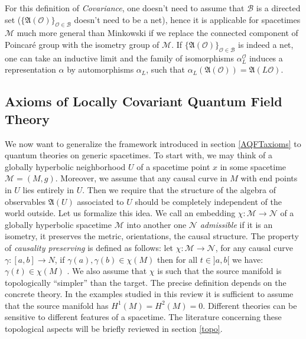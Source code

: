 \documentclass[12pt]{article}
\newcommand{\fA}{\mathfrak{A}}
\newcommand{\Ncal}{\mathcal{N}}
\newcommand{\Mcal}{\mathcal{M}}
\newcommand{\Ocal}{\mathcal{O}}
\newcommand{\al}{\alpha}
\newcommand{\1}{\mathds{1}}                         %
\begin{document}
\begin{rem}
For this definition of \textit{Covariance}, one doesn't need to assume that $\mathcal{B}$ is a directed set ($\{\fA(\Ocal)\}_{\Ocal\in\mathcal{B}}$ doesn't need to be a net), hence it is applicable for spacetimes $\Mcal$ much more general than Minkowski if we replace the connected component of Poincar\'e group with the isometry group of $\Mcal$. If $\{\fA(\Ocal)\}_{\Ocal\in\mathcal{B}}$ is indeed a net, one can take an inductive limit and the family of isomorphisms $\alpha_L^\Ocal$ induces a representation $\al$ by automorphisms $\al_L$, such that $\al_L(\fA(\Ocal))=\fA(L\Ocal)$. 
\end{rem}
\subsection{Axioms of Locally Covariant Quantum Field Theory}\label{axioms}
We now want to generalize the framework introduced in section \ref{AQFTaxioms} to quantum theories on generic spacetimes. To start with, we may think of a globally hyperbolic neighborhood  $U$ of a spacetime point $x$ in some spacetime  $\Mcal=(M,g)$. 
Moreover, we assume that any causal curve in $M$ with end points in $U$ lies entirely 
in $U$. Then we require that the structure of the algebra of observables $\fA(U)$ associated to $U$ should be completely independent of the world outside. Let us formalize this idea. We call an embedding $\chi:\Mcal\to \Ncal$ of a globally hyperbolic spacetime $\mathcal{M}$ into another one $\Ncal$ \textit{admissible} if it is an isometry, it preserves the metric, orientations, the causal structure. The property of \textit{causality preserving} is defined as follows: let $\chi:\Mcal\to \Ncal$, for any causal curve $\gamma : [a,b]\to N$, if $\gamma(a),\gamma(b)\in\chi(M)$ then for all $t	\in ]a,b[$ we have: $\gamma(t)\in\chi(M)$ . We also assume that $\chi$ is such that the source manifold is topologically ``simpler'' than the target. The precise definition depends on the concrete theory. In the examples studied in this review it is sufficient to assume that the source manifold has $H^1(M)=H^2(M)={0}$. Different theories can be sensitive to different features of a spacetime. The literature concerning these topological aspects will be briefly reviewed in section \ref{topo}. 
\end{document}
